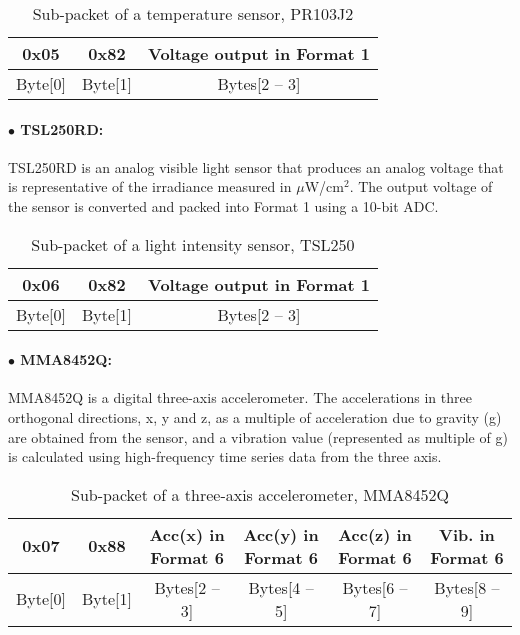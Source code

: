 \begin{table}[h!]
    \centering
    \caption{Sub-packet of a temperature sensor, PR103J2}
    \begin{tabular}{|c|c|c|}
        \hline
        \rowcolor{black!8}
        \textbf{0x05} & \textbf{0x82} & \textbf{Voltage output in Format 1} \\
        \hline
        Byte[0] & Byte[1] & Bytes[2 -- 3]\\ \hline
    \end{tabular}
\end{table}


\paragraph{$\bullet$ TSL250RD:}

TSL250RD is an analog visible light sensor that produces an analog voltage that is
representative of the irradiance measured in $\mu$W/cm$^2$. The output voltage of the sensor
is converted and packed into Format 1 using a 10-bit ADC.


\begin{table}[h!]
    \centering
    \caption{Sub-packet of a light intensity sensor, TSL250}
    \begin{tabular}{|c|c|c|}
        \hline
        \rowcolor{black!8}
        \textbf{0x06} & \textbf{0x82} & \textbf{Voltage output in Format 1} \\
        \hline
        Byte[0] & Byte[1] & Bytes[2 -- 3]\\ \hline
    \end{tabular}
\end{table}


\paragraph{$\bullet$ MMA8452Q:}

MMA8452Q is a digital three-axis accelerometer. The accelerations in three orthogonal directions,
x, y and z, as a multiple of acceleration due to gravity (g) are obtained from the sensor,
and a vibration value (represented as multiple of g) is calculated using high-frequency
time series data from the three axis.

\begin{table}[h!]
    \centering
    \caption{Sub-packet of a three-axis accelerometer, MMA8452Q}
    \begin{tabular}{|c|c|c|c|c|c|}
        \hline
        \rowcolor{black!8}
        \textbf{0x07} & \textbf{0x88} & Acc(x) in Format 6 & Acc(y) in Format 6 & Acc(z) in Format 6 & Vib. in Format 6\\
        \hline
        Byte[0] & Byte[1] & Bytes[2 -- 3] & Bytes[4 -- 5] & Bytes[6 -- 7] & Bytes[8 -- 9] \\ \hline
    \end{tabular}
\end{table}



